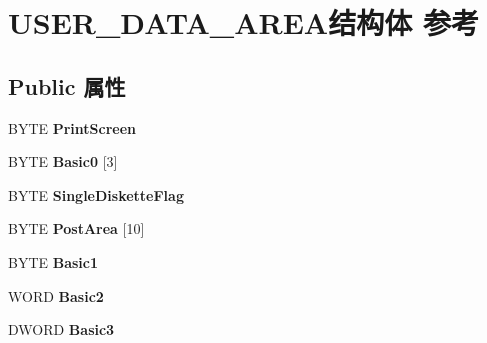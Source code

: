 \hypertarget{struct_u_s_e_r___d_a_t_a___a_r_e_a}{}\section{U\+S\+E\+R\+\_\+\+D\+A\+T\+A\+\_\+\+A\+R\+E\+A结构体 参考}
\label{struct_u_s_e_r___d_a_t_a___a_r_e_a}
\subsection*{Public 属性}
\begin{DoxyCompactItemize}
\item 
\mbox{\label{struct_u_s_e_r___d_a_t_a___a_r_e_a_aa2b5325cab6d0608270490685e580060}} 
B\+Y\+TE {\bfseries Print\+Screen}
\item 
\mbox{\label{struct_u_s_e_r___d_a_t_a___a_r_e_a_ab2578b397b81a33f5c06b236d16aced3}} 
B\+Y\+TE {\bfseries Basic0} \mbox{[}3\mbox{]}
\item 
\mbox{\label{struct_u_s_e_r___d_a_t_a___a_r_e_a_ad58061700584131ad51e64436c8291e5}} 
B\+Y\+TE {\bfseries Single\+Diskette\+Flag}
\item 
\mbox{\label{struct_u_s_e_r___d_a_t_a___a_r_e_a_ae99c9f6f0ae47c5b61eb79832eba9aa0}} 
B\+Y\+TE {\bfseries Post\+Area} \mbox{[}10\mbox{]}
\item 
\mbox{\label{struct_u_s_e_r___d_a_t_a___a_r_e_a_a155f464a942efbf81b26851b15e49b70}} 
B\+Y\+TE {\bfseries Basic1}
\item 
\mbox{\label{struct_u_s_e_r___d_a_t_a___a_r_e_a_a4d798050cdef0f4f7e88bdaac71d5ea6}} 
W\+O\+RD {\bfseries Basic2}
\item 
\mbox{\label{struct_u_s_e_r___d_a_t_a___a_r_e_a_acfbbc5cad50a5f84fb2c8ac53186bd00}} 
D\+W\+O\+RD {\bfseries Basic3}
\item 
\mbox{\label{struct_u_s_e_r___d_a_t_a___a_r_e_a_aa6d5fbc94db27b1ce316656da29d5f41}} 

\end{DoxyCompactItemize}
